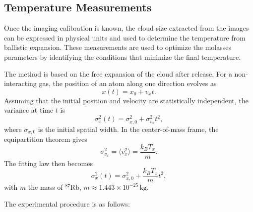 \subsection{Temperature Measurements}

Once the imaging calibration is known, the cloud size extracted from the images can be expressed in physical units and used to determine the temperature from ballistic expansion. These measurements are used to optimize the molasses parameters by identifying the conditions that minimize the final temperature.

The method is based on the free expansion of the cloud after release. For a non-interacting gas, the position of an atom along one direction evolves as
\begin{equation}
    x(t) = x_0 + v_x t.
\end{equation}
Assuming that the initial position and velocity are statistically independent, the variance at time $t$ is
\begin{equation}
    \sigma_x^2(t) = \sigma_{x,0}^2 + \sigma_{v_x}^2 t^2,
\end{equation}
where $\sigma_{x,0}$ is the initial spatial width. In the center-of-mass frame, the equipartition theorem gives
\begin{equation}
    \sigma_{v_x}^2 = \langle v_x^2 \rangle = \frac{k_B T_x}{m}.
\end{equation}
The fitting law then becomes
\begin{equation}
    \sigma_x^2(t) = \sigma_{x,0}^2 + \frac{k_B T_x}{m} t^2,
    \label{eq:ballistic_expansion}
\end{equation}
with $m$ the mass of $^{87}\mathrm{Rb}$, $m \approx 1.443\times10^{-25}\,\mathrm{kg}$.

The experimental procedure is as follows:

